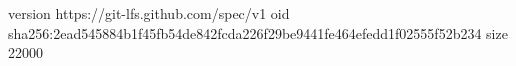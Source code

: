 version https://git-lfs.github.com/spec/v1
oid sha256:2ead545884b1f45fb54de842fcda226f29be9441fe464efedd1f02555f52b234
size 22000
